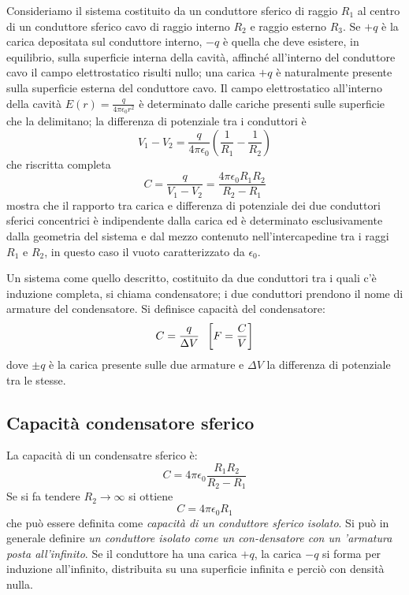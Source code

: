 \documentclass[class=book, crop=false, oneside, 12pt]{standalone}
\begin{document}
Consideriamo il sistema costituito da un conduttore sferico di raggio \(R_1\) al centro di un conduttore sferico cavo di raggio interno \(R_2\) e raggio esterno \(R_3\).
Se \(+q\) è la carica depositata sul conduttore interno, \(-q\) è quella che deve esistere, in equilibrio, sulla superficie interna della cavità, affinché all'interno del conduttore cavo il campo elettrostatico risulti nullo; una carica \(+q\) è naturalmente presente sulla superficie esterna del conduttore cavo. 
Il campo elettrostatico all'interno della cavità \(E(r) = \frac{q}{4 \pi \epsilon_0 r^2}\) è  determinato dalle cariche presenti sulle superficie che la delimitano; la differenza di potenziale tra i conduttori è 
\begin{equation*}
    V_1 - V_2 = \frac{q}{4 \pi \epsilon_0} \left(\frac{1}{R_1} - \frac{1}{R_2}\right)
\end{equation*}
che riscritta completa
\begin{equation}
    C = \frac{q}{V_1 - V_2} = \frac{4 \pi \epsilon_0 R_1 R_2}{R_2 - R_1}
\end{equation}
mostra che il rapporto tra carica e differenza di potenziale dei due conduttori sferici concentrici è indipendente dalla carica ed è determinato esclusivamente dalla geometria del sistema e dal mezzo contenuto nell'intercapedine tra i raggi \(R_1\) e \(R_2\), in questo caso il vuoto caratterizzato da \(\epsilon_0\).

Un sistema come quello descritto, costituito da due conduttori tra i quali c'è induzione completa, si chiama condensatore; i due conduttori prendono il nome di armature del condensatore. 
Si definisce capacità del condensatore:
\begin{equation}
    C = \frac{q}{\Delta V} \hspace{0.2cm} \left[F = \frac{C}{V}\right]
\end{equation}
dove \(\pm q\) è la carica presente sulle due armature e \(\Delta V\) la differenza di potenziale tra le stesse.

\subsection{Capacità condensatore sferico}

La capacità di un condensatre sferico è:
\begin{equation}
    C = 4 \pi \epsilon_0 \frac{R_1 R_2}{R_2 - R_1}
\end{equation}
Se si fa tendere \(R_2 \rightarrow \infty\) si ottiene
\begin{equation}
    C = 4 \pi \epsilon_0 R_1
\end{equation}
che può essere definita come \emph{capacità di un conduttore sferico isolato}.
Si può in generale definire \emph{un conduttore isolato come un con-densatore con un 'armatura posta all'infinito}.
Se il conduttore ha una carica \(+q\), la carica \(- q\) si forma per induzione all'infinito, distribuita su una superficie infinita e perciò con densità nulla.
\end{document}
